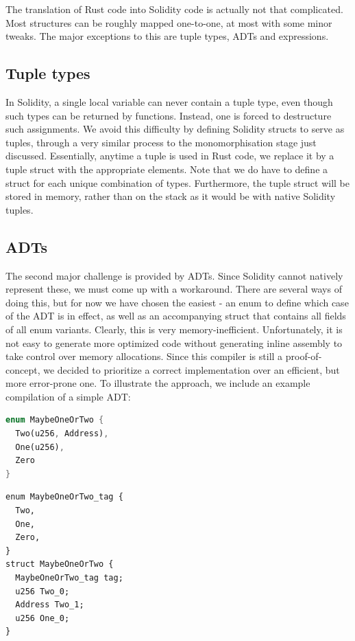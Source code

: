 The translation of Rust code into Solidity code is actually not that complicated. Most structures can be roughly mapped one-to-one, at most with some minor tweaks. The major exceptions to this are tuple types, ADTs and  expressions.

\subsection{Tuple types}
In Solidity, a single local variable can never contain a tuple type, even though such types can be returned by functions. Instead, one is forced to destructure such assignments. We avoid this difficulty by defining Solidity structs to serve as tuples, through a very similar process to the monomorphisation stage just discussed. Essentially, anytime a tuple is used in Rust code, we replace it by a tuple struct with the appropriate elements. Note that we do have to define a struct for each unique combination of types. Furthermore, the tuple struct will be stored in memory, rather than on the stack as it would be with native Solidity tuples.

\subsection{ADTs}
The second major challenge is provided by ADTs. Since Solidity cannot natively represent these, we must come up with a workaround. There are several ways of doing this, but for now we have chosen the easiest - an enum to define which case of the ADT is in effect, as well as an accompanying struct that contains all fields of all enum variants. Clearly, this is very memory-inefficient. Unfortunately, it is not easy to generate more optimized code without generating inline assembly to take control over memory allocations. Since this compiler is still a proof-of-concept, we decided to prioritize a correct implementation over an efficient, but more error-prone one. To illustrate the approach, we include an example compilation of a simple ADT:

\noindent\begin{minipage}[t]{.5\textwidth}
\begin{lstlisting}[language=Rust, style=boxed]
enum MaybeOneOrTwo {
  Two(u256, Address),
  One(u256),
  Zero
}
\end{lstlisting}
\end{minipage}
\begin{minipage}[t]{.5\textwidth}
\begin{lstlisting}[language=Solidity, style=boxedSol]
enum MaybeOneOrTwo_tag {
  Two,
  One,
  Zero,
}
struct MaybeOneOrTwo {
  MaybeOneOrTwo_tag tag;
  u256 Two_0;
  Address Two_1;
  u256 One_0;
}
\end{lstlisting}
\end{minipage}

